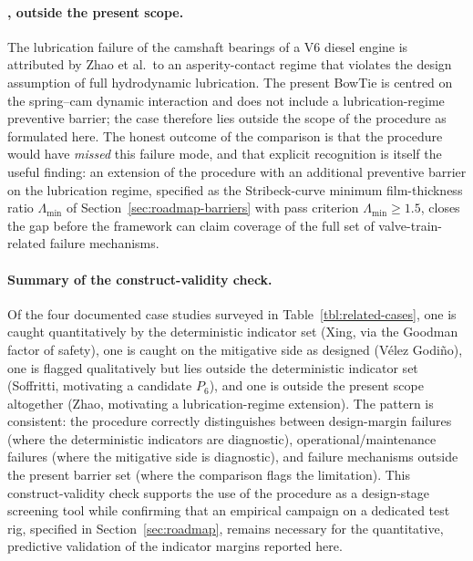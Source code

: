 \paragraph{\citet{zhao2023camshaftV6}, outside the present
scope.}
The lubrication failure of the camshaft bearings of a V6 diesel
engine is attributed by Zhao et al.\ to an asperity-contact regime
that violates the design assumption of full hydrodynamic
lubrication. The present BowTie is centred on the spring--cam
dynamic interaction and does not include a lubrication-regime
preventive barrier; the case therefore lies outside the scope of
the procedure as formulated here. The honest outcome of the
comparison is that the procedure would have \emph{missed} this
failure mode, and that explicit recognition is itself the
useful finding: an extension of the procedure with an additional
preventive barrier on the lubrication regime, specified as the
Stribeck-curve minimum film-thickness ratio $\Lambda_{\min}$ of
Section~\ref{sec:roadmap-barriers} with pass criterion
$\Lambda_{\min}\geq 1.5$, closes the gap before the framework can
claim coverage of the full set of valve-train-related failure
mechanisms.

\paragraph{Summary of the construct-validity check.}
Of the four documented case studies surveyed in
Table~\ref{tbl:related-cases}, one is caught quantitatively by the
deterministic indicator set (Xing, via the Goodman factor of
safety), one is caught on the mitigative side as designed
(V\'elez Godi\~no), one is flagged qualitatively but lies outside
the deterministic indicator set (Soffritti, motivating a candidate
$P_{6}$), and one is outside the present scope altogether (Zhao,
motivating a lubrication-regime extension). The pattern is
consistent: the procedure correctly distinguishes between
design-margin failures (where the deterministic indicators are
diagnostic), operational/maintenance failures (where the mitigative
side is diagnostic), and failure mechanisms outside the present
barrier set (where the comparison flags the limitation). This
construct-validity check supports the use of the procedure as a
design-stage screening tool while confirming that an empirical campaign
on a dedicated test rig, specified in Section~\ref{sec:roadmap}, remains necessary for the quantitative, predictive validation of
the indicator margins reported here.
